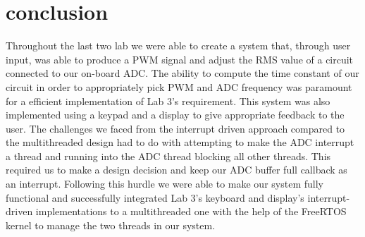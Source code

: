\section{conclusion}

\label{section:conclusion}

Throughout the last two lab we were able to create a system that, through user input, was able to produce a PWM signal and adjust the RMS value of a circuit connected to our on-board ADC. The ability to compute the time constant of our circuit in order to appropriately pick PWM and ADC frequency was paramount for a efficient implementation of Lab 3's requirement. This system was also implemented using a keypad and a display to give appropriate feedback to the user. The challenges we faced from the interrupt driven approach compared to the multithreaded design had to do with attempting to make the ADC interrupt a thread and running into the ADC thread blocking all other threads. This required us to make a design decision and keep our ADC buffer full callback as an interrupt. Following this hurdle we were able to make our system fully functional and successfully integrated Lab 3's keyboard and display's interrupt-driven implementations to a multithreaded one with the help of the FreeRTOS kernel to manage the two threads in our system.

